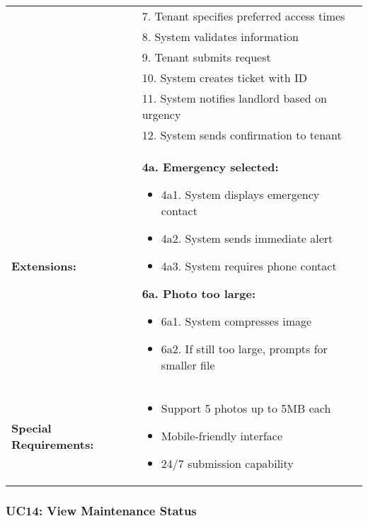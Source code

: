 \documentclass[12pt]{article}
\begin{document}
\begin{tabular}{|p{3cm}|p{11cm}|}
& 7. Tenant specifies preferred access times \\
& 8. System validates information \\
& 9. Tenant submits request \\
& 10. System creates ticket with ID \\
& 11. System notifies landlord based on urgency \\
& 12. System sends confirmation to tenant \\
\hline
\textbf{Extensions:} & 
\textbf{4a. Emergency selected:}
\begin{itemize}
    \item 4a1. System displays emergency contact
    \item 4a2. System sends immediate alert
    \item 4a3. System requires phone contact
\end{itemize}
\textbf{6a. Photo too large:}
\begin{itemize}
    \item 6a1. System compresses image
    \item 6a2. If still too large, prompts for smaller file
\end{itemize} \\
\hline
\textbf{Special Requirements:} & 
\begin{itemize}
    \item Support 5 photos up to 5MB each
    \item Mobile-friendly interface
    \item 24/7 submission capability
\end{itemize} \\
\hline
\end{tabular}

\subsubsection{UC14: View Maintenance Status}
\end{document}
